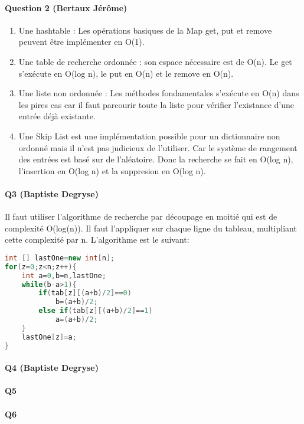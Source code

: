 \documentclass[a4paper]{article}
\begin{document}
\paragraph{Question 2 (Bertaux Jérôme)}
\begin{enumerate}
\item Une hashtable : Les opérations basiques de la Map get, put et remove peuvent être implémenter en O(1).
\item Une table de recherche ordonnée : son espace nécessaire est de O(n). Le get s'exécute en O(log n), le put en O(n) et le remove en O(n).
\item Une liste non ordonnée : Les méthodes fondamentales s'exécute en O(n) dans les pires cas car il faut parcourir toute la liste pour vérifier l'existance d'une entrée déjà existante.
\item Une Skip List est une implémentation possible pour un dictionnaire non ordonné mais il n'est pas judicieux de l'utiliser. Car le système de rangement des entrées est basé sur de l'aléatoire. Donc la recherche se fait en O(log n), l'insertion en O(log n) et la suppresion en O(log n).
\end{enumerate}

\paragraph{Q3 (Baptiste Degryse)}
Il faut utiliser l'algorithme de recherche par découpage en moitié qui est de complexité O(log(n)). Il faut l'appliquer sur chaque ligne du tableau, multipliant cette complexité par n. L'algorithme est le suivant:
\begin{lstlisting}[language=Java]
int [] lastOne=new int[n];
for(z=0;z<n;z++){
	int a=0,b=n,lastOne;
	while(b-a>1){
		if(tab[z][(a+b)/2]==0)
			b=(a+b)/2;
		else if(tab[z][(a+b)/2]==1)
			a=(a+b)/2;
	}
	lastOne[z]=a;
}

\end{lstlisting}

\paragraph{Q4 (Baptiste Degryse)}

\paragraph{Q5}

\paragraph{Q6}
\end{document}
